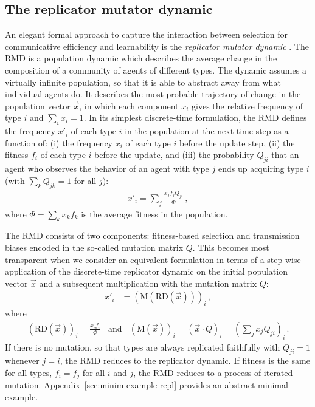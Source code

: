 \documentclass[a4paper, 11pt]{article}
\theoremstyle{Satz}
\begin{document}
\subsection{The replicator mutator dynamic}
An elegant formal approach to capture the interaction between selection for communicative
efficiency and learnability is the \emph{replicator mutator dynamic}
\citep{Hofbauer1985:The-Selection-M,nowak+etal:2000,NowakKomarova2001:Evolution-of-Un,hofbauer+sigmund:2003,nowak:2006}. The
RMD is a population dynamic which describes the average change in the composition of a
community of agents of different types. The dynamic assumes a virtually infinite population, so
that it is able to abstract away from what individual agents do. It describes the most probable
trajectory of change in the population vector $\vec{x}$, in which each component $x_i$ gives
the relative frequency of type $i$ and $\sum\nolimits_i x_i = 1$. In its simplest discrete-time
formulation, the RMD defines the frequency $x'_i$ of each type $i$ in the population at the
next time step as a function of: (i) the frequency $x_i$ of each type $i$ before the update
step, (ii) the fitness $f_i$ of each type $i$ before the update, and (iii) the probability
$Q_{ji}$ that an agent who observes the behavior of an agent with type $j$ ends up acquiring
type $i$ (with $\sum_k Q_{jk} = 1$ for all $j$):
\begin{align}
  \label{eq:RMD_discrete}
  x'_i = \sum_j \frac{x_jf_j Q_{ji}}{\Phi}\,,
\end{align}
where $\Phi = \sum_k x_k f_k$ is the average fitness in the population.  


The RMD consists of two components: fitness-based selection and transmission biases encoded in
the so-called mutation matrix $Q$. This becomes most transparent when we consider an equivalent
formulation in terms of a step-wise application of the discrete-time replicator dynamic
\citep{TaylorJonker1978:Evolutionary-St} on the initial population vector $\vec{x}$ and a
subsequent multiplication with the mutation matrix $Q$:
\begin{align}
  \label{eq:RMD_discrete_recast}
  x'_i & = (\text{M}(\text{RD}(\vec{x})))_i\,,
\end{align}
where
\begin{align*}
      \left ( \text{RD}(\vec{x}) \right )_i 
         = \frac{x_i f_i}{\Phi}
 \ \ \ \ \text{and} \ \ \ \ 
  (\text{M}(\vec{x}))_i = (\vec{x} \cdot Q)_i = \left ( \sum_j
          x_j Q_{ji} \right)_i\,.
\end{align*}
%
If there is no mutation, so that types are always replicated faithfully with $Q_{ji}=1$
whenever $j=i$, the RMD reduces to the replicator dynamic. If fitness is the same for all
types, $f_i = f_j$ for all $i$ and $j$, the RMD reduces to a process of iterated
mutation. Appendix~\ref{sec:minim-example-repl} provides an abstract minimal example.
\end{document}
